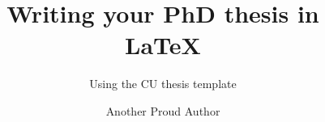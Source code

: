 \title{Writing your PhD thesis in \texorpdfstring{\\ \LaTeX}{LaTeX}}

\subtitle{Using the CU thesis template}

\author{Another Proud Author}






     



\renewcommand{\submissiontext}{A thesis submitted in partial fulfilment of the University's requirements 
for the Degree of}


